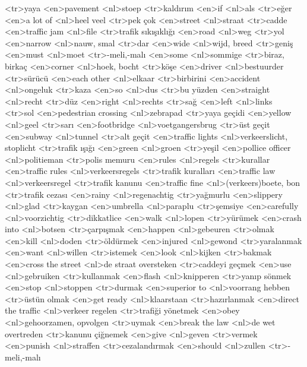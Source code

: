 <tr>yaya
<en>pavement
<nl>stoep
<tr>kaldırım
<en>if
<nl>als
<tr>eğer
<en>a lot of
<nl>heel veel
<tr>pek çok
<en>street
<nl>straat
<tr>cadde
<en>traffic jam
<nl>file
<tr>trafik sıkışıklığı
<en>road
<nl>weg
<tr>yol
<en>narrow
<nl>nauw, smal
<tr>dar
<en>wide
<nl>wijd, breed
<tr>geniş
<en>must
<nl>moet
<tr>-meli,-malı
<en>some
<nl>sommige
<tr>biraz, birkaç
<en>corner
<nl>hoek, bocht
<tr>köşe
<en>driver
<nl>bestuurder
<tr>sürücü
<en>each other
<nl>elkaar
<tr>birbirini
<en>accident
<nl>ongeluk
<tr>kaza
<en>so
<nl>dus
<tr>bu yüzden
<en>straight
<nl>recht
<tr>düz
<en>right
<nl>rechts
<tr>sağ
<en>left
<nl>links
<tr>sol
<en>pedestrian crossing
<nl>zebrapad
<tr>yaya geçidi
<en>yellow
<nl>geel
<tr>sarı
<en>footbridge
<nl>voetgangersbrug
<tr>üst geçit
<en>subway
<nl>tunnel
<tr>alt geçit
<en>traffic lights
<nl>verkeerslicht, stoplicht
<tr>trafik ışığı
<en>green
<nl>groen
<tr>yeşil
<en>pollice officer
<nl>politieman
<tr>polis memuru
<en>rules
<nl>regels
<tr>kurallar
<en>traffic rules
<nl>verkeersregels
<tr>trafik kuralları
<en>traffic law
<nl>verkeersregel
<tr>trafik kanunu
<en>traffic fine
<nl>(verkeers)boete, bon
<tr>trafik cezası
<en>rainy
<nl>regenachtig
<tr>yağmurlu
<en>slippery
<nl>glad
<tr>kaygan
<en>umbrella
<nl>paraplu
<tr>şemsiye
<en>carefully
<nl>voorzichtig
<tr>dikkatlice
<en>walk
<nl>lopen
<tr>yürümek
<en>crash into
<nl>botsen
<tr>çarpışmak
<en>happen
<nl>gebeuren
<tr>olmak
<en>kill
<nl>doden
<tr>öldürmek
<en>injured
<nl>gewond
<tr>yaralanmak
<en>want
<nl>willen
<tr>istemek
<en>look
<nl>kijken
<tr>bakmak
<en>cross the street
<nl>de straat oversteken
<tr>caddeyi geçmek
<en>use
<nl>gebruiken
<tr>kullanmak
<en>flash
<nl>knipperen
<tr>yanıp sönmek
<en>stop
<nl>stoppen
<tr>durmak
<en>superior to
<nl>voorrang hebben
<tr>üstün olmak
<en>get ready
<nl>klaarstaan
<tr>hazırlanmak
<en>direct the traffic
<nl>verkeer regelen
<tr>trafiği yönetmek
<en>obey
<nl>gehoorzamen, opvolgen
<tr>uymak
<en>break the law
<nl>de wet overtreden
<tr>kanunu çiğnemek
<en>give
<nl>geven
<tr>vermek
<en>punish
<nl>straffen
<tr>cezalandırmak
<en>should
<nl>zullen
<tr>-meli,-malı
